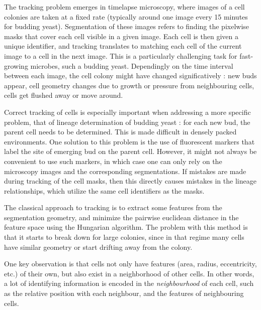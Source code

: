 \documentclass[10pt,conference,compsocconf,a4paper]{IEEEtran}
\begin{document}
	The tracking problem emerges in timelapse microscopy, where images of a cell colonies are taken at a fixed rate (typically around one image every 15 minutes for budding yeast). Segmentation of these images refers to finding the pixelwise masks that cover each cell visible in a given image. Each cell is then given a unique identifier, and tracking translates to matching each cell of the current image to a cell in the next image. This is a particularly challenging task for fast-growing microbes, such a budding yeast. Dependingly on the time interval between each image, the cell colony might have changed significatively : new buds appear, cell geometry changes due to growth or pressure from neighbouring cells, cells get flushed away or move around.

	Correct tracking of cells is especially important when addressing a more specific problem, that of lineage determination of budding yeast : for each new bud, the parent cell needs to be determined. This is made difficult in densely packed environments. One solution to this problem is the use of fluorescent markers that label the site of emerging bud on the parent cell. However, it might not always be convenient to use such markers, in which case one can only rely on the microscopy images and the corresponding segmentations. If mistakes are made during tracking of the cell masks, then this directly causes mistakes in the lineage relationships, which utilize the same cell identifiers as the masks.
	

	The classical approach to tracking is to extract some features from the segmentation geometry, %
	and minimize the pairwise euclidean distance in the feature space using the Hungarian algorithm. The problem with this method is that it starts to break down for large colonies, since in that regime many cells have similar geometry or start drifting away from the colony.
	
	One key observation is that cells not only have features (area, radius, eccentricity, etc.) of their own, but also exist in a neighborhood of other cells. In other words, a lot of identifying information is encoded in the \textit{neighbourhood} of each cell, such as the relative position with each neighbour, and the features of neighbouring cells.
\end{document}
